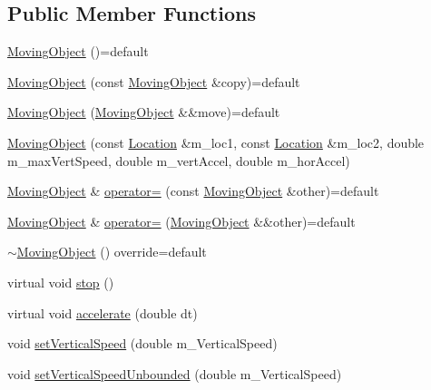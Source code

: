 \subsection*{Public Member Functions}
\begin{DoxyCompactItemize}
\item 
\hyperlink{classroadfighter_1_1MovingObject_acd1afb2c2845299fc2b6a7e729368ba9}{Moving\+Object} ()=default
\item 
\hyperlink{classroadfighter_1_1MovingObject_ae9c48dc389d0a594ea7bd108849e467f}{Moving\+Object} (const \hyperlink{classroadfighter_1_1MovingObject}{Moving\+Object} \&copy)=default
\item 
\hyperlink{classroadfighter_1_1MovingObject_a759ad597bca6a44c49adf7082fe44469}{Moving\+Object} (\hyperlink{classroadfighter_1_1MovingObject}{Moving\+Object} \&\&move)=default
\item 
\hyperlink{classroadfighter_1_1MovingObject_a5da76d54101b6f2847dc9cdde8dd40cf}{Moving\+Object} (const \hyperlink{classroadfighter_1_1Location}{Location} \&m\+\_\+loc1, const \hyperlink{classroadfighter_1_1Location}{Location} \&m\+\_\+loc2, double m\+\_\+max\+Vert\+Speed, double m\+\_\+vert\+Accel, double m\+\_\+hor\+Accel)
\item 
\hyperlink{classroadfighter_1_1MovingObject}{Moving\+Object} \& \hyperlink{classroadfighter_1_1MovingObject_a46d710b11219a0e973eb1e4d3b375851}{operator=} (const \hyperlink{classroadfighter_1_1MovingObject}{Moving\+Object} \&other)=default
\item 
\hyperlink{classroadfighter_1_1MovingObject}{Moving\+Object} \& \hyperlink{classroadfighter_1_1MovingObject_ae2150a0937d9e1b978bcdf2ba1628677}{operator=} (\hyperlink{classroadfighter_1_1MovingObject}{Moving\+Object} \&\&other)=default
\item 
\hyperlink{classroadfighter_1_1MovingObject_aabb801baf353d53a36998983abbb803a}{$\sim$\+Moving\+Object} () override=default
\item 
virtual void \hyperlink{classroadfighter_1_1MovingObject_ac9f197ee0e91754d2fd653c0b8c84c57}{stop} ()
\item 
virtual void \hyperlink{classroadfighter_1_1MovingObject_ab516489c0569b625c41a1bb9cac19d97}{accelerate} (double dt)
\item 
void \hyperlink{classroadfighter_1_1MovingObject_a7382aeb5c2e7254dde2cc571c85a8fbb}{set\+Vertical\+Speed} (double m\+\_\+\+Vertical\+Speed)
\item 
void \hyperlink{classroadfighter_1_1MovingObject_a9aa56ab17060aabcae8604633993323f}{set\+Vertical\+Speed\+Unbounded} (double m\+\_\+\+Vertical\+Speed)

\end{DoxyCompactItemize}
